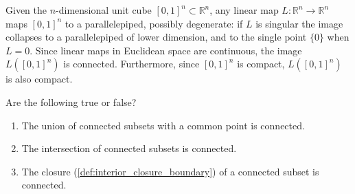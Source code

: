 \begin{corollary}
\label{cor:linear_maps_unit_cube}
Given the $n$-dimensional unit cube $[0,1]^n \subset \mathbb{R}^n$, any linear map $L : \mathbb{R}^n \to \mathbb{R}^n$ maps $[0,1]^n$ to a parallelepiped, possibly degenerate: if $L$ is singular the image collapses to a parallelepiped of lower dimension, and to the single point $\{0\}$ when $L = 0$. Since linear maps in Euclidean space are continuous, the image $L([0,1]^n)$ is connected. Furthermore, since $[0,1]^n$ is compact, $L([0,1]^n)$ is also compact.
\end{corollary}

\begin{exercise}
\label{ex:connectedness_tf}
Are the following true or false?
\begin{enumerate}[label=\textbf{(\alph*)}]
  \item The union of connected subsets with a common point is connected.
  \item The intersection of connected subsets is connected.
  \item The closure (\cref{def:interior_closure_boundary}) of a connected subset is connected.
\end{enumerate}
\end{exercise}

